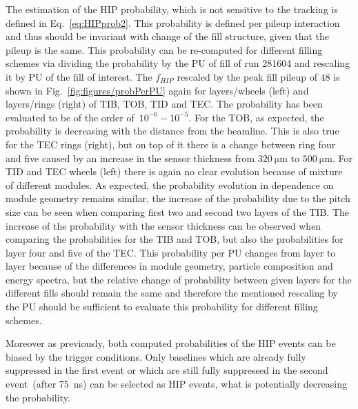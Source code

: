 The estimation of the HIP probability, which is not sensitive to the tracking is defined in Eq.~\ref{eq:HIPprob2}. This probability is defined per pileup interaction and thus should be invariant with change of the fill structure, given that the pileup is the same. This probability can be re-computed for different filling schemes via dividing the probability by the PU of fill of run 281604 and rescaling it by PU of the fill of interest. The $f_{HIP}$ rescaled by the peak fill pileup of $48$ is shown in Fig.~\ref{fig:figures/probPerPU} again for layers/wheels (left) and layers/rings (right) of TIB, TOB, TID and TEC. The probability has been evaluated to be of the order of~$10^{-6}-10^{-5}$. For the TOB, as expected, the probability is decreasing with the distance from the beamline. This is also true for the TEC rings (right),  but on top of it there is a change between ring four and five caused by an increase in the sensor thickness from $320~\mathrm{\mu m}$ to $500~\mathrm{\mu m}$. For TID and TEC wheels (left) there is again no clear evolution because of mixture of different modules. As expected, the probability evolution in dependence on module geometry remains similar, the increase of the probability due to the pitch size can be seen when comparing first two and second two layers of the TIB. The increase of the probability with the sensor thickness can be observed when comparing the probabilities for the TIB and TOB, but also the probabilities for layer four and five of the TEC. This probability per PU changes from layer to layer because of the differences in module geometry, particle composition and energy spectra, but the relative change of probability between given layers for the different fills should remain the same and therefore the mentioned rescaling by the PU should be sufficient to evaluate this probability for different filling schemes.


Moreover as previously, both computed probabilities of the HIP events can be biased by the trigger conditions. Only baselines which are already fully suppressed in the first event or which are still fully suppressed in the second event~(after 75~ns) can be selected as HIP events, what is potentially decreasing the probability.



